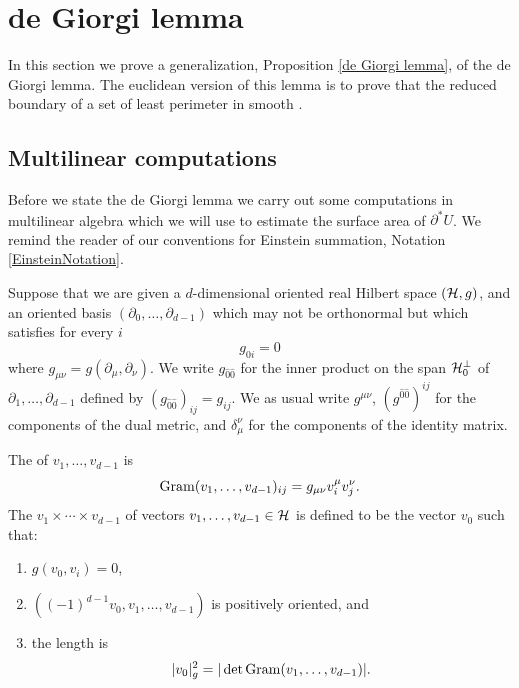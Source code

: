 \section{de Giorgi lemma}\label{DeGiorgiSection}
In this section we prove a generalization, Proposition \ref{de Giorgi lemma}, of the de Giorgi lemma.
The euclidean version of this lemma \cite[Teorema 5.7]{Miranda66} is to prove that the reduced boundary of a set of least perimeter in smooth \cite[Teorema 6.4]{Miranda66}.

\subsection{Multilinear computations}
Before we state the de Giorgi lemma we carry out some computations in multilinear algebra which we will use to estimate the surface area of $\partial^* U$.
We remind the reader of our conventions for Einstein summation, Notation \ref{EinsteinNotation}.

Suppose that we are given a $d$-dimensional oriented real Hilbert space $(\mathcal H, g)$, and an oriented basis $(\partial_0, \dots, \partial_{d - 1})$ which may not be orthonormal but which satisfies for every $i$
\begin{equation}\label{0th coordinate orthogonal}
g_{0i} = 0
\end{equation}
where $g_{\mu\nu} = g(\partial_\mu, \partial_\nu)$.
We write $g_{\hat 0 \hat 0}$ for the inner product on the span $\mathcal H_0^\perp$ of $\partial_1, \dots, \partial_{d - 1}$ defined by $(g_{\hat 0 \hat 0})_{ij} = g_{ij}$.
We as usual write $g^{\mu\nu}$, $(g^{\hat 0 \hat 0})^{ij}$ for the components of the dual metric, and $\delta_\mu^\nu$ for the components of the identity matrix.

\begin{definition}
The  of $v_1, \dots, v_{d - 1}$ is
$$\operatorname{Gram}(v_1, \dots, v_{d - 1})_{ij} = g_{\mu \nu} v_i^\mu v_j^\nu.$$
The  $v_1 \times \cdots \times v_{d - 1}$ of vectors $v_1, \dots, v_{d - 1} \in \mathcal H$ is defined to be the vector $v_0$
such that:
\begin{enumerate}
\item $g(v_0, v_i) = 0$,
\item $((-1)^{d - 1} v_0, v_1, \dots, v_{d - 1})$ is positively oriented, and
\item the length is
$$|v_0|_g^2 = |\det \operatorname{Gram}(v_1, \dots, v_{d - 1})|.$$
\end{enumerate}
\end{definition}

